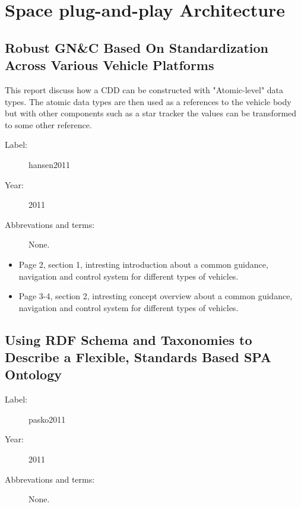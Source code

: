 \chapter{Space plug-and-play Architecture}

\section{Robust GN\&C Based On Standardization
Across Various Vehicle Platforms}

This report discuss how a CDD can be constructed with "Atomic-level" data
types. The atomic data types are then used as a references to the vehicle body
but with other components such as a star tracker the values can be transformed
to some other reference.

\begin{description}
    \item[Label:] hansen2011 \cite{hansen2011}
    \item[Year:] 2011
    \item[Abbrevations and terms:] None.
\end{description}

\begin{itemize}
    \item Page 2, section 1, intresting introduction about a common guidance,
        navigation and control system for different types of vehicles.
    \item Page 3-4, section 2, intresting concept overview about a common
        guidance, navigation and control system for different types of
        vehicles.
\end{itemize}

\section{Using RDF Schema and Taxonomies to Describe a Flexible, Standards
Based SPA Ontology}

\begin{description}
    \item[Label:] pasko2011 \cite{pasko2011}
    \item[Year:] 2011
    \item[Abbrevations and terms:] None.
\end{description}


